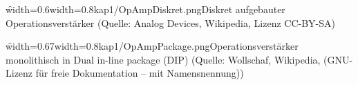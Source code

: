 \begin{frame}
{    %
    \begin{minipage}[t]{0.5\textwidth}
        \f{width=0.6\textwidth}{width=0.8\textwidth}{kap1/OpAmpDiskret.png}{Diskret aufgebauter Operationsverstärker {\tiny(Quelle: Analog Devices, Wikipedia, Lizenz CC-BY-SA)}} %
    \end{minipage}    
    \begin{minipage}[t]{0.5\textwidth}
        \f{width=0.67\textwidth}{width=0.8\textwidth}{kap1/OpAmpPackage.png}{Operationsverstärker monolithisch in Dual in-line package (DIP) {\tiny(Quelle: Wollschaf, Wikipedia, (GNU-Lizenz für freie Dokumentation – mit Namensnennung))}} %
    \end{minipage}  
%        
        
    }


\end{frame}
